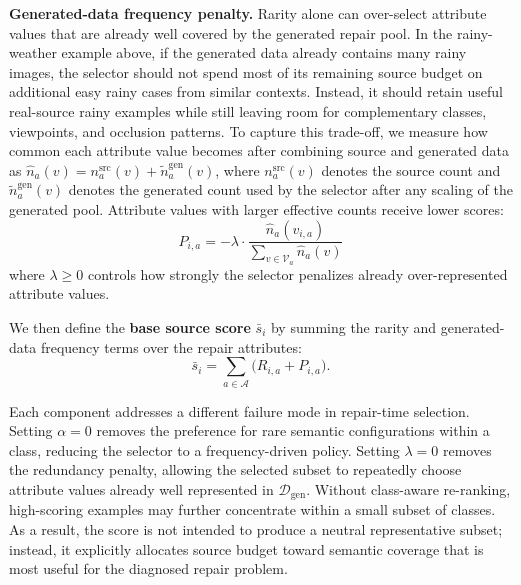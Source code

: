 \documentclass{article}
\newcommand{\dataset}{\mathcal{D}}
\newcommand{\attrs}{\mathcal{A}}
\newcommand{\vals}{\mathcal{V}}
\begin{document}
\noindent\textbf{Generated-data frequency penalty.} Rarity alone can over-select attribute values that are already well covered by the generated repair pool. In the rainy-weather example above, if the generated data already contains many rainy images, the selector should not spend most of its remaining source budget on additional easy rainy cases from similar contexts. Instead, it should retain useful real-source rainy examples while still leaving room for complementary classes, viewpoints, and occlusion patterns. To capture this trade-off, we measure how common each attribute value becomes after combining source and generated data as $\hat{n}_a(v) = n_a^{\mathrm{src}}(v) + \tilde{n}_a^{\mathrm{gen}}(v)$, where $n_a^{\mathrm{src}}(v)$ denotes the source count and $\tilde{n}_a^{\mathrm{gen}}(v)$ denotes the generated count used by the selector after any scaling of the generated pool. Attribute values with larger effective counts receive lower scores:
\begin{equation}
\label{eq:frequency-penalty}
P_{i,a} = -\lambda \cdot \frac{\hat{n}_a(v_{i,a})}{\sum_{v \in \vals_a} \hat{n}_a(v)}
\end{equation}
where $\lambda \geq 0$ controls how strongly the selector penalizes already over-represented attribute values.

We then define the \textbf{base source score} $\bar{s}_i$ by summing the rarity and generated-data frequency terms over the repair attributes:
\begin{equation} \label{eq:base-attribute-score} \bar{s}_i = \sum_{a \in \attrs} \Big( R_{i,a} + P_{i,a} \Big). \end{equation}

Each component addresses a different failure mode in repair-time selection. Setting $\alpha=0$ removes the preference for rare semantic configurations within a class, reducing the selector to a frequency-driven policy. Setting $\lambda=0$ removes the redundancy penalty, allowing the selected subset to repeatedly choose attribute values already well represented in $\dataset_{\mathrm{gen}}$. Without class-aware re-ranking, high-scoring examples may further concentrate within a small subset of classes. As a result, the score is not intended to produce a neutral representative subset; instead, it explicitly allocates source budget toward semantic coverage that is most useful for the diagnosed repair problem.
\end{document}
